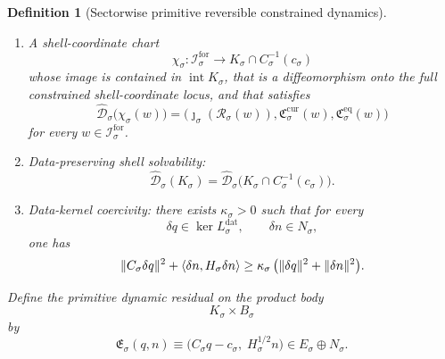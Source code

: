 \documentclass[11pt]{article}
\newcommand{\ForSpace}[1]{\mathcal I_{#1}^{\mathrm{for}}}
\newcommand{\Reduction}[1]{\mathcal R_{#1}}
\newcommand{\CurrentCarrier}[1]{\mathfrak C_{#1}^{\mathrm{cur}}}
\newcommand{\EqCarrier}[1]{\mathfrak C_{#1}^{\mathrm{eq}}}
\newcommand{\TimeRev}[1]{\tau_{#1}}
\newcommand{\CoordSpace}[1]{Q_{#1}}
\newcommand{\CoordBody}[1]{K_{#1}}
\newcommand{\NormalSpace}[1]{N_{#1}}
\newcommand{\NormalBody}[1]{B_{#1}}
\newcommand{\AffineData}[1]{\widehat{\mathcal D}_{#1}}
\newcommand{\ConstraintMap}[1]{C_{#1}}
\newcommand{\ConstraintValue}[1]{c_{#1}}
\newcommand{\NormalOperator}[1]{H_{#1}}
\newcommand{\SymGroup}[1]{G_{#1}}
\newcommand{\ShellChart}[1]{\chi_{#1}}
\newcommand{\DynamicResidual}[1]{\mathfrak E_{#1}}
\newcommand{\LinearData}[1]{L_{#1}^{\mathrm{dat}}}
\newtheorem{definition}{Definition}
\begin{document}
\begin{definition}[Sectorwise primitive reversible constrained dynamics]
\begin{enumerate}
\[    \]
    preserving \(\CoordBody{\sigma}\), \(\NormalBody{\sigma}\), \(\AffineData{\sigma}\), \(\ConstraintMap{\sigma}\), and \(\NormalOperator{\sigma}\), together with an orthogonal involution
    \[
    \TimeRev{\sigma}\in O(\CoordSpace{\sigma})\times O(\NormalSpace{\sigma})
    \]
    that commutes with \(\SymGroup{\sigma}\) and preserves the same data.
    \item A shell-coordinate chart
    \[
    \ShellChart{\sigma}:\ForSpace{\sigma}\to \CoordBody{\sigma}\cap \ConstraintMap{\sigma}^{-1}(\ConstraintValue{\sigma})
    \]
    whose image is contained in \(\operatorname{int}\CoordBody{\sigma}\), that is a diffeomorphism onto the full constrained shell-coordinate locus, and that satisfies
    \begin{equation}
    \AffineData{\sigma}\bigl(\ShellChart{\sigma}(w)\bigr)
    =
    \bigl(
    \jmath_{\sigma}(\Reduction{\sigma}(w)),
    \CurrentCarrier{\sigma}(w),
    \EqCarrier{\sigma}(w)
    \bigr)
    \label{eq:shellchartcompat}
    \end{equation}
    for every \(w\in\ForSpace{\sigma}\).
    \item Data-preserving shell solvability:
    \begin{equation}
    \AffineData{\sigma}(\CoordBody{\sigma})
    =
    \AffineData{\sigma}
    \bigl(
    \CoordBody{\sigma}\cap \ConstraintMap{\sigma}^{-1}(\ConstraintValue{\sigma})
    \bigr).
    \label{eq:solvability}
    \end{equation}
    \item Data-kernel coercivity: there exists \(\kappa_{\sigma}>0\) such that for every
    \[
    \delta q\in \ker \LinearData{\sigma},
    \qquad
    \delta n\in \NormalSpace{\sigma},
    \]
    one has
    \begin{equation}
    \|\ConstraintMap{\sigma}\delta q\|^{2}
    +
    \ev{\delta n,\NormalOperator{\sigma}\delta n}
    \ge
    \kappa_{\sigma}\,
    \bigl(
    \|\delta q\|^{2}+\|\delta n\|^{2}
    \bigr).
    \label{eq:kernelcoercive}
    \end{equation}
\end{enumerate}
Define the primitive dynamic residual on the product body
\[
\CoordBody{\sigma}\times\NormalBody{\sigma}
\]
by
\begin{equation}
\DynamicResidual{\sigma}(q,n)
\equiv
\bigl(
\ConstraintMap{\sigma}q-\ConstraintValue{\sigma},
\;
\NormalOperator{\sigma}^{1/2}n
\bigr)
\in E_{\sigma}\oplus\NormalSpace{\sigma}.
\label{eq:dynamicresidual}
\end{equation}
\end{definition}
\end{document}
